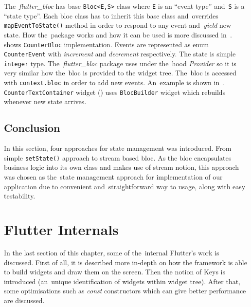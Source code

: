 The~\textit{flutter\_bloc} has base \verb|Bloc<E,S>| class where \verb|E| is an ``event type'' and~\verb|S| is a ``state type''. Each \gls{bloc} class has to inherit this base class and~overrides \verb|mapEventToState()| method in order to respond to any event and~\textit{yield} new state. How the~package works and how it can be used is more discussed in~.  shows \verb|CounterBloc| implementation. Events are represented as enum \verb|CounterEvent| with \textit{increment} and \textit{decrement} respectively. The state is simple \verb|integer| type. The~\textit{flutter\_bloc} package uses under the~hood \textit{Provider} so it is very similar how the~\gls{bloc} is provided to the widget tree. The~\gls{bloc} is accessed with \verb|context.bloc| in order to add new events. An~example is shown in~.  \verb|CounterTextContainer| widget () uses \verb|BlocBuilder| widget which rebuilds whenever new state arrives. 
\subsection{Conclusion}
In this section, four approaches for state management was introduced. From simple \verb|setState()| approach to stream based \gls{bloc}. As the \gls{bloc} encapsulates business logic into its own class and makes use of stream notion, this approach was chosen as the~state management approach for implementation of our application due to convenient and~straightforward way to usage, along with easy testability.
\section{Flutter Internals}
In the last section of this chapter, some of the~internal Flutter's work is discussed. First of all, it is described more in-depth on how the framework is able to build widgets and draw them on the screen. Then the notion of Keys is introduced (an~unique identification of widgets within widget tree). After that, some optimisations such as \textit{const} constructors which can give better performance are discussed. 

